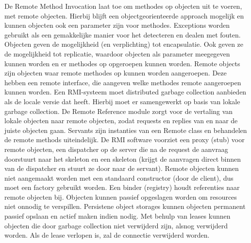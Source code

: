 \documentclass[../samenvatting.tex]{subfiles}
\begin{document}
De Remote Method Invocation laat toe om methodes op objecten uit te voeren, met remote objecten. Hierbij blijft een objectgeorienteerde approach mogelijk en kunnen objecten ook een parameter zijn voor methodes. Exceptions worden gebruikt als een gemakkelijke manier voor het detecteren en dealen met fouten. Objecten geven de mogelijkheid (en verplichting) tot encapsulatie. Ook geven ze de mogelijkheid tot replicatie, waardoor objecten als parameter meegegeven kunnen worden en er methodes op opgeroepen kunnen worden. Remote objects zijn objecten waar remote methodes op kunnen worden aangeroepen. Deze hebben een remote interface, die aangeven welke methodes remote aangeroepen kunnen worden. Een RMI-systeem moet distributed garbage collection aanbieden als de locale versie dat heeft. Hierbij moet er samengewerkt op basis van lokale garbage collection. De Remote Reference module zorgt voor de vertaling van lokale objecten naar remote objecten, zodat requests en replies van en naar de juiste objecten gaan. Servants zijn instanties van een Remote class en behandelen de remote methods uiteindelijk. De RMI software voorziet een proxy (stub) voor remote objecten, een dispatcher op de server die na de request de aanvraag doorstuurt naar het skeleton en een skeleton (krijgt de aanvragen direct binnen van de dispatcher en stuurt ze door naar de servant). Remote objecten kunnen niet aangemaakt worden met een standaard constructor (door de client), dus moet een factory gebruikt worden. Een binder (registry) houdt referenties naar remote objecten bij. Objecten kunnen passief opgeslagen worden om resources niet onnodig te verspillen. Persistene object storages kunnen objecten permanent passief opslaan en actief maken indien nodig. Met behulp van leases kunnen objecten die door garbage collection niet verwijderd zijn, alsnog verwijderd worden. Als de lease verlopen is, zal de connectie verwijderd worden.
\end{document}
